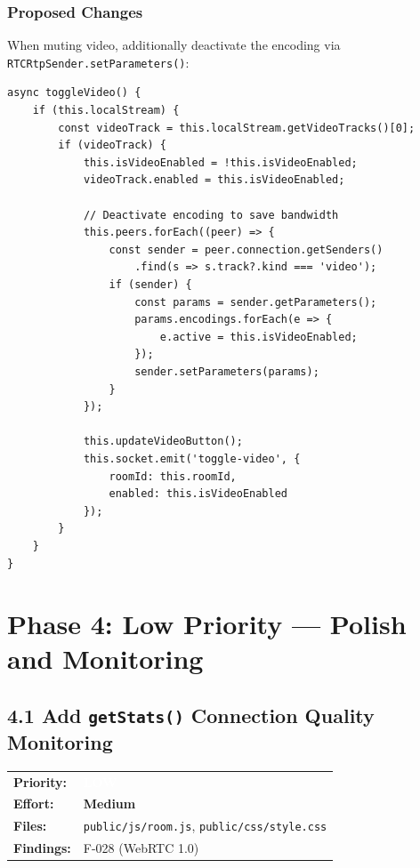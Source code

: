 \documentclass[11pt,letterpaper]{article}
\newcommand{\prilow}{\colorbox{notapplicable}{\textcolor{white}{\small\textbf{LOW}}}}
\newcommand{\effmedium}{\colorbox{partial!30}{\small\textbf{Medium}}}
\begin{document}
\subsubsection{Proposed Changes}

When muting video, additionally deactivate the encoding via \texttt{RTCRtpSender.setParameters()}:

\begin{verbatim}
async toggleVideo() {
    if (this.localStream) {
        const videoTrack = this.localStream.getVideoTracks()[0];
        if (videoTrack) {
            this.isVideoEnabled = !this.isVideoEnabled;
            videoTrack.enabled = this.isVideoEnabled;

            // Deactivate encoding to save bandwidth
            this.peers.forEach((peer) => {
                const sender = peer.connection.getSenders()
                    .find(s => s.track?.kind === 'video');
                if (sender) {
                    const params = sender.getParameters();
                    params.encodings.forEach(e => {
                        e.active = this.isVideoEnabled;
                    });
                    sender.setParameters(params);
                }
            });

            this.updateVideoButton();
            this.socket.emit('toggle-video', {
                roomId: this.roomId,
                enabled: this.isVideoEnabled
            });
        }
    }
}
\end{verbatim}

\newpage

\section{Phase 4: Low Priority --- Polish and Monitoring}

\subsection{4.1 Add \texttt{getStats()} Connection Quality Monitoring}

\begin{tabular}{ll}
\textbf{Priority:} & \prilow \\
\textbf{Effort:} & \effmedium \\
\textbf{Files:} & \texttt{public/js/room.js}, \texttt{public/css/style.css} \\
\textbf{Findings:} & F-028 (WebRTC 1.0) \\
\end{tabular}
\end{document}
